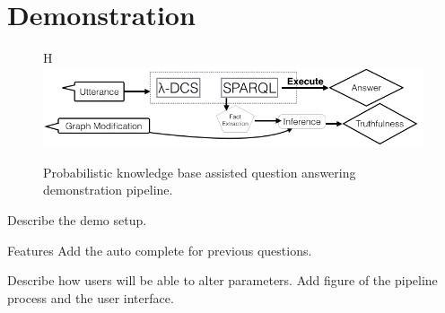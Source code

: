 
\section{Demonstration}

\begin{multicols}{2}
\centering
\begin{figure}{H}
 \includegraphics[width=\linewidth]{images/probqa-pipeline.png}
 \caption{Probabilistic knowledge base assisted question answering demonstration pipeline.}
\label{fig:probqa-pipeline}
\end{figure}
\end{multicols}

Describe the demo setup. 

Features
  Add the auto complete for previous questions.

Describe how users will be able to alter parameters.
Add figure of the pipeline process and the user interface.

